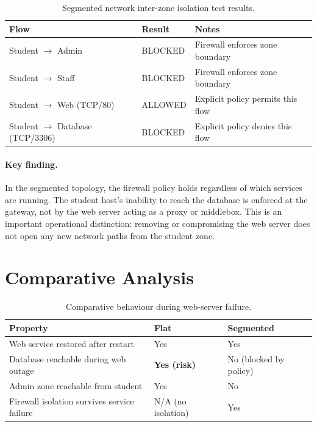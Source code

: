 \begin{table}[H]
\centering
\caption[Segmented network inter-zone isolation results]{Segmented network inter-zone isolation test results.}
\label{tab:node-seg-isolation}
\begin{tabularx}{\textwidth}{l X X}
\toprule
\textbf{Flow} & \textbf{Result} & \textbf{Notes} \\
\midrule
Student $\rightarrow$ Admin & BLOCKED & Firewall enforces zone boundary \\
Student $\rightarrow$ Staff & BLOCKED & Firewall enforces zone boundary \\
Student $\rightarrow$ Web (TCP/80) & ALLOWED & Explicit policy permits this flow \\
Student $\rightarrow$ Database (TCP/3306) & BLOCKED & Explicit policy denies this flow \\
\bottomrule
\end{tabularx}
\end{table}

\paragraph{Key finding.} In the segmented topology, the firewall policy holds regardless of which services are running. The student host's inability to reach the database is enforced at the gateway, not by the web server acting as a proxy or middlebox. This is an important operational distinction: removing or compromising the web server does not open any new network paths from the student zone.

\section{Comparative Analysis}

\begin{table}[H]
\centering
\caption[Node availability comparative analysis]{Comparative behaviour during web-server failure.}
\label{tab:node-compare}
\begin{tabularx}{\textwidth}{l X X}
\toprule
\textbf{Property} & \textbf{Flat} & \textbf{Segmented} \\
\midrule
Web service restored after restart & Yes & Yes \\
Database reachable during web outage & \textbf{Yes (risk)} & No (blocked by policy) \\
Admin zone reachable from student & Yes & No \\
Firewall isolation survives service failure & N/A (no isolation) & Yes \\
\bottomrule
\end{tabularx}
\end{table}

